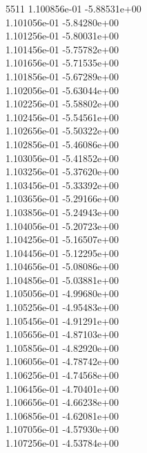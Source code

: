 5511	1.100856e-01	-5.88531e+00	\\ 	1.101056e-01	-5.84280e+00	\\ 	1.101256e-01	-5.80031e+00	\\ 	1.101456e-01	-5.75782e+00	\\ 	1.101656e-01	-5.71535e+00	\\ 	1.101856e-01	-5.67289e+00	\\ 	1.102056e-01	-5.63044e+00	\\ 	1.102256e-01	-5.58802e+00	\\ 	1.102456e-01	-5.54561e+00	\\ 	1.102656e-01	-5.50322e+00	\\ 	1.102856e-01	-5.46086e+00	\\ 	1.103056e-01	-5.41852e+00	\\ 	1.103256e-01	-5.37620e+00	\\ 	1.103456e-01	-5.33392e+00	\\ 	1.103656e-01	-5.29166e+00	\\ 	1.103856e-01	-5.24943e+00	\\ 	1.104056e-01	-5.20723e+00	\\ 	1.104256e-01	-5.16507e+00	\\ 	1.104456e-01	-5.12295e+00	\\ 	1.104656e-01	-5.08086e+00	\\ 	1.104856e-01	-5.03881e+00	\\ 	1.105056e-01	-4.99680e+00	\\ 	1.105256e-01	-4.95483e+00	\\ 	1.105456e-01	-4.91291e+00	\\ 	1.105656e-01	-4.87103e+00	\\ 	1.105856e-01	-4.82920e+00	\\ 	1.106056e-01	-4.78742e+00	\\ 	1.106256e-01	-4.74568e+00	\\ 	1.106456e-01	-4.70401e+00	\\ 	1.106656e-01	-4.66238e+00	\\ 	1.106856e-01	-4.62081e+00	\\ 	1.107056e-01	-4.57930e+00	\\ 	1.107256e-01	-4.53784e+00	\\ \hline

